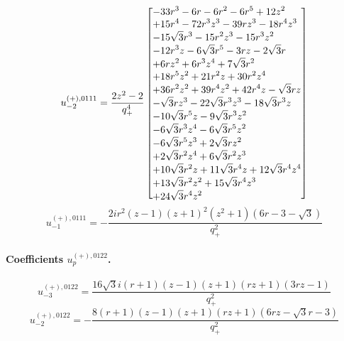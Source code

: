 \documentclass[11pt,a4paper]{article}
\begin{document}
\begin{equation}
u_{-2}^{(+),0111}=\frac{2 z^{2} - 2}{q_{+}^{4}}\left[\vcenter{\hbox{\shortstack[l]{$\displaystyle  - 33 r^{3} - 6 r - 6 r^{2} - 6 r^{5} + 12 z^{2}$\\
$\displaystyle  + 15 r^{4} - 72 r^{3} z^{3} - 39 r z^{3} - 18 r^{4} z^{3}$\\
$\displaystyle  - 15 \sqrt{3} r^{3} - 15 r^{2} z^{3} - 15 r^{3} z^{2}$\\
$\displaystyle  - 12 r^{3} z - 6 \sqrt{3} r^{5} - 3 r z - 2 \sqrt{3} r$\\
$\displaystyle  + 6 r z^{2} + 6 r^{3} z^{4} + 7 \sqrt{3} r^{2}$\\
$\displaystyle  + 18 r^{5} z^{2} + 21 r^{2} z + 30 r^{2} z^{4}$\\
$\displaystyle  + 36 r^{2} z^{2} + 39 r^{4} z^{2} + 42 r^{4} z - \sqrt{3} r z$\\
$\displaystyle  - \sqrt{3} r z^{3} - 22 \sqrt{3} r^{3} z^{3} - 18 \sqrt{3} r^{3} z$\\
$\displaystyle  - 10 \sqrt{3} r^{5} z - 9 \sqrt{3} r^{3} z^{2}$\\
$\displaystyle  - 6 \sqrt{3} r^{3} z^{4} - 6 \sqrt{3} r^{5} z^{2}$\\
$\displaystyle  - 6 \sqrt{3} r^{5} z^{3} + 2 \sqrt{3} r z^{2}$\\
$\displaystyle  + 2 \sqrt{3} r^{2} z^{4} + 6 \sqrt{3} r^{2} z^{3}$\\
$\displaystyle  + 10 \sqrt{3} r^{2} z + 11 \sqrt{3} r^{4} z + 12 \sqrt{3} r^{4} z^{4}$\\
$\displaystyle  + 13 \sqrt{3} r^{2} z^{2} + 15 \sqrt{3} r^{4} z^{3}$\\
$\displaystyle  + 24 \sqrt{3} r^{4} z^{2}$}}}\right]
\label{eq:cat-auxiliary-plus-0111-m2}
\end{equation}
\begin{equation}
u_{-1}^{(+),0111}=- \frac{2 i r^{2} \left(z - 1\right) \left(z + 1\right)^{2} \left(z^{2} + 1\right) \left(6 r - 3 - \sqrt{3}\right)}{q_{+}^{2}}
\label{eq:cat-auxiliary-plus-0111-m1}
\end{equation}
\paragraph{Coefficients $u_p^{(+),0122}$.}
\begin{equation}
u_{-3}^{(+),0122}=\frac{16 \sqrt{3} i \left(r + 1\right) \left(z - 1\right) \left(z + 1\right) \left(r z + 1\right) \left(3 r z - 1\right)}{q_{+}^{2}}
\label{eq:cat-auxiliary-plus-0122-m3}
\end{equation}
\begin{equation}
u_{-2}^{(+),0122}=- \frac{8 \left(r + 1\right) \left(z - 1\right) \left(z + 1\right) \left(r z + 1\right) \left(6 r z - \sqrt{3} r - 3\right)}{q_{+}^{2}}
\label{eq:cat-auxiliary-plus-0122-m2}
\end{equation}
\end{document}
